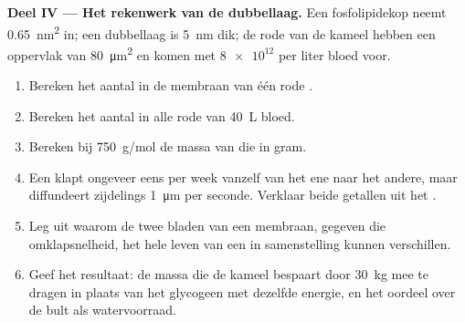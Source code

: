 \begin{problem}
\medskip
\noindent\textbf{Deel IV --- Het rekenwerk van de dubbellaag.}
Een fosfolipidekop neemt \qty{0.65}{nm^2} in; een dubbellaag is \qty{5}{nm} dik;
de rode  van de kameel hebben een oppervlak van \qty{80}{\micro m^2} en
komen met $\num{8e12}$ per liter bloed voor.
\begin{enumerate}[resume]
  \item Bereken het aantal  in de membraan van één rode .
  \item Bereken het aantal in alle rode  van \qty{40}{L} bloed.
  \item Bereken bij \qty{750}{g/mol} de massa van die  in gram.
  \item Een  klapt ongeveer eens per week vanzelf van het ene
         naar het andere, maar diffundeert zijdelings \qty{1}{\micro m}
        per seconde. Verklaar beide getallen uit het .
  \item Leg uit waarom de twee bladen van een membraan, gegeven die
        omklapsnelheid, het hele leven van een  in samenstelling kunnen
        verschillen.
  \item Geef het resultaat: de massa die de kameel bespaart door
        \qty{30}{kg}  mee te dragen in plaats van het glycogeen met
        dezelfde energie, en het oordeel over de bult als watervoorraad.
\end{enumerate}
\end{problem}
